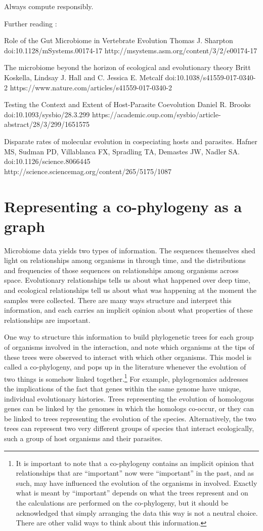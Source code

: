 \documentclass[
10pt, %
a4paper, %
oneside, %
headinclude,footinclude, %
BCOR5mm, %
]{scrartcl}
\begin{document}
Always compute responsibly.

Further reading :

Role of the Gut Microbiome in Vertebrate Evolution
Thomas J. Sharpton 
doi:10.1128/mSystems.00174-17
http://msystems.asm.org/content/3/2/e00174-17

The microbiome beyond the horizon of ecological and evolutionary theory
Britt Koskella, Lindsay J. Hall and C. Jessica E. Metcalf
doi:10.1038/s41559-017-0340-2
https://www.nature.com/articles/s41559-017-0340-2

Testing the Context and Extent of Host-Parasite Coevolution
Daniel R. Brooks
doi:10.1093/sysbio/28.3.299
https://academic.oup.com/sysbio/article-abstract/28/3/299/1651575

Disparate rates of molecular evolution in cospeciating hosts and parasites.
Hafner MS, Sudman PD, Villablanca FX, Spradling TA, Demastes JW, Nadler SA.
doi:10.1126/science.8066445
http://science.sciencemag.org/content/265/5175/1087




\section{Representing a co-phylogeny as a graph}

Microbiome data yields two types of information. The sequences themselves shed light on relationships among organisms in through time, and the distributions and frequencies of those sequences on relationships among organisms across space. Evolutionary relationships tells us about what happened over deep time, and ecological relationships tell us about what was happening at the moment the samples were collected. There are many ways structure and interpret this information, and each carries an implicit opinion about what properties of these relationships are important.

One way to structure this information to build phylogenetic trees for each group of organisms involved in the interaction, and note which organisms at the tips of these trees were observed to interact with which other organisms. This model is called a co-phylogeny, and pops up in the literature whenever the evolution of two things is somehow linked together.\footnote{It is important to note that a co-phylogeny contains an implicit opinion that relationships that are ``important'' now were ``important'' in the past, and as such, may have influenced the evolution of the organisms in involved. Exactly what is meant by ``important'' depends on what the trees represent and on the calculations are performed on the co-phylogeny, but it should be acknowledged that simply arranging the data this way is not a neutral choice. There are other valid ways to think about this information.} For example, phylogenomics addresses the implications of the fact that genes within the same genome have unique, individual evolutionary histories. Trees representing the evolution of homologous genes can be linked by the genomes in which the homologs co-occur, or they can be linked to trees representing the evolution of the species. Alternatively, the two trees can represent two very different groups of species that interact ecologically, such a group of host organisms and their parasites.
\end{document}
